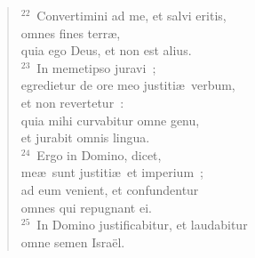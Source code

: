 \begin{flushleft}
\begin{verse}
${}^{22}$~Convertimini ad me, et salvi eritis,\\ omnes fines terr\ae ,\\ quia ego Deus, et non est alius.\\
${}^{23}$~In memetipso juravi~;\\ egredietur de ore meo justiti\ae\ verbum,\\ et non revertetur~:\\ quia mihi curvabitur omne genu,\\ et jurabit omnis lingua.\\
${}^{24}$~Ergo in Domino, dicet,\\ me\ae\ sunt justiti\ae\ et imperium~;\\ ad eum venient, et confundentur\\ omnes qui repugnant ei.\\
${}^{25}$~In Domino justificabitur, et laudabitur\\ omne semen Isra\"el.\end{verse}\end{flushleft}


